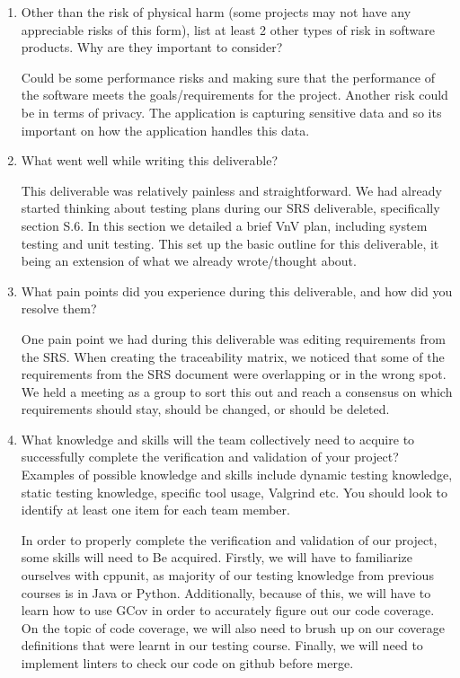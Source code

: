 \begin{enumerate}
\item Other than the risk of physical harm (some projects may not have any
appreciable risks of this form), list at least 2 other types of risk in
software products. Why are they important to consider?

Could be some performance risks and making sure that the performance of the software meets the goals/requirements for the project.
Another risk could be in terms of privacy. The application is capturing sensitive data and so its important on how the application handles this data.

\item What went well while writing this deliverable?

This deliverable was relatively painless and straightforward. We had already started thinking about testing plans
during our SRS deliverable, specifically section S.6. In this section we detailed a brief VnV plan, including system testing
and unit testing. This set up the basic outline for this deliverable, it being an extension of what we already wrote/thought about.

\item What pain points did you experience during this deliverable, and how
  did you resolve them?

One pain point we had during this deliverable was editing requirements from the SRS. When creating the traceability matrix, we noticed
that some of the requirements from the SRS document were overlapping or in the wrong spot. We held a meeting as a group to sort this out 
and reach a consensus on which requirements should stay, should be changed, or should be deleted.

\item What knowledge and skills will the team collectively need to acquire to
successfully complete the verification and validation of your project?
Examples of possible knowledge and skills include dynamic testing knowledge,
static testing knowledge, specific tool usage, Valgrind etc.  You should look to
identify at least one item for each team member.

In order to properly complete the verification and validation of our project, some skills will need to Be
acquired. Firstly, we will have to familiarize ourselves with cppunit, as majority of our testing knowledge from
previous courses is in Java or Python. Additionally, because of this, we will have to learn how to use GCov in order to
accurately figure out our code coverage. On the topic of code coverage, we will also need to brush up on our coverage 
definitions that were learnt in our testing course. Finally, we will need to implement linters to check our code on github
before merge.


\end{enumerate}

